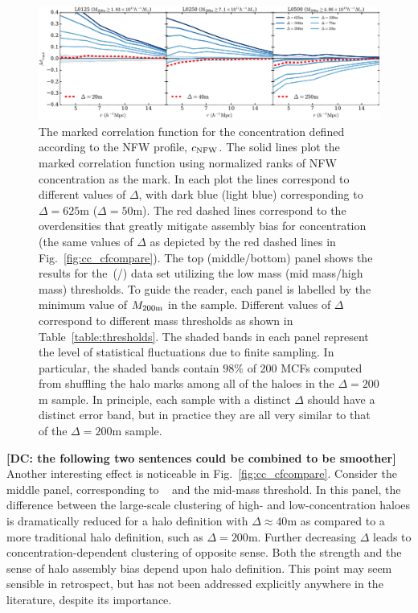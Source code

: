 \documentclass[usenatbib,fleqn]{mnras}
\begin{document}
\begin{figure}
	\centering
	\includegraphics[width=\textwidth]{all_mcf_cNFW.pdf}
	\caption{
The marked correlation function for the concentration defined according to the NFW profile, $c_{\rm NFW}$. The solid lines plot the marked correlation function using normalized ranks of NFW concentration as the mark. In each plot the lines correspond to different values of $\Delta$, with dark blue (light blue) corresponding to $\Delta = 625$m ($\Delta = 50$m). The red dashed lines correspond to the overdensities that greatly mitigate assembly bias for concentration (the same values of $\Delta$ as depicted by the red dashed lines in Fig.~\ref{fig:cc_cfcompare}). The top (middle/bottom) panel shows the results for the\simA \ (\simB /\simC) data set utilizing the low mass (mid mass/high mass) thresholds. To guide the reader, each panel is labelled by the minimum value of $M_{200{\rm m}}$ in the sample. Different values of $\Delta$ correspond to different mass thresholds as shown in Table~\ref{table:thresholds}. The shaded bands in each panel represent the level of statistical fluctuations due to finite sampling. In particular, the shaded bands contain $98\%$ of 200 MCFs computed from shuffling the halo marks among all of the haloes in the $\Delta=200$m sample. In principle, each sample with a distinct $\Delta$ should have a distinct error band, but in practice they are all very similar to that of the $\Delta=200$m sample.
}
\label{fig:cc_mcf_cnfw}
\end{figure}

{\bf [DC: the following two sentences could be combined to be smoother]} Another interesting effect is noticeable in Fig.~\ref{fig:cc_cfcompare}. Consider the middle panel, corresponding to \simB~ and the mid-mass threshold. In this panel, the difference between the large-scale clustering of high- and low-concentration haloes is dramatically reduced for a halo definition with $\Delta \approx 40$m as compared to a more traditional halo definition, such as $\Delta=200$m. 
Further decreasing $\Delta$ leads to concentration-dependent clustering of opposite sense. Both the strength and the sense of halo assembly bias depend upon halo definition. This point may seem sensible in retrospect, but has not been addressed explicitly anywhere in the literature, despite its importance.
\end{document}
